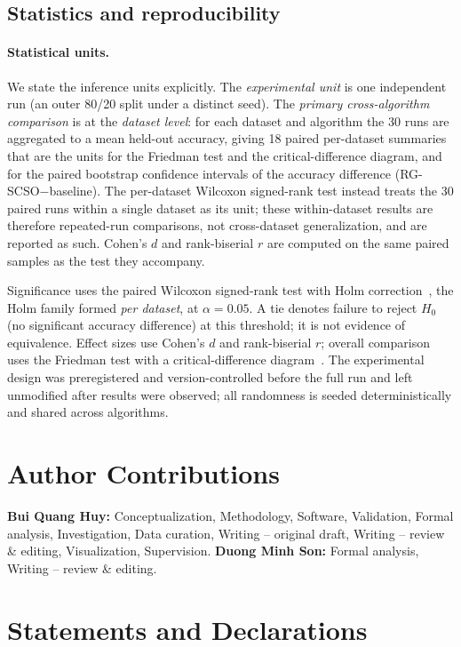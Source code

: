 \documentclass[iicol,sn-basic,pdflatex]{sn-jnl}
\begin{document}
\subsection{Statistics and reproducibility}
\paragraph{Statistical units.} We state the inference units explicitly. The
\emph{experimental unit} is one independent run (an outer 80/20 split under a
distinct seed). The \emph{primary cross-algorithm comparison} is at the
\emph{dataset level}: for each dataset and algorithm the 30 runs are
aggregated to a mean held-out accuracy, giving 18 paired per-dataset
summaries that are the units for the Friedman test and the critical-difference
diagram, and for the paired bootstrap confidence intervals of the
accuracy difference (RG-SCSO$-$baseline). The per-dataset Wilcoxon signed-rank
test instead treats the 30 paired runs within a single dataset as its unit;
these within-dataset results are therefore repeated-run comparisons, not
cross-dataset generalization, and are reported as such. Cohen's $d$ and
rank-biserial $r$ are computed on the same paired samples as the test they
accompany.

Significance uses the paired Wilcoxon signed-rank test with Holm
correction~\cite{holm}, the Holm family formed \emph{per dataset}, at
$\alpha=0.05$. A tie denotes failure to reject $H_0$ (no significant
accuracy difference) at this threshold; it is not evidence of equivalence.
Effect sizes use Cohen's $d$ and rank-biserial $r$; overall comparison uses the
Friedman test with a critical-difference diagram~\cite{demsar}. The
experimental design was preregistered and version-controlled before the full
run and left unmodified after results were observed; all randomness is
seeded deterministically and shared across algorithms.

\section*{Author Contributions}
\textbf{Bui Quang Huy:} Conceptualization, Methodology, Software,
Validation, Formal analysis, Investigation, Data curation, Writing --
original draft, Writing -- review \& editing, Visualization, Supervision.
\textbf{Duong Minh Son:} Formal analysis, Writing -- review \& editing.

\section*{Statements and Declarations}
\end{document}
